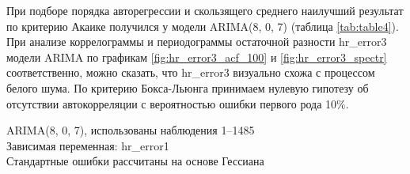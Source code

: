 \documentclass[a4paper,12pt]{article}
\begin{document}
При подборе порядка авторегрессии и скользящего среднего наилучший результат по критерию Акаике получился у модели ARIMA(8, 0, 7) (таблица \ref{tab:table4}). При анализе коррелограммы и периодограммы остаточной разности hr\_error3 модели ARIMA по графикам \ref{fig:hr_error3_acf_100} и \ref{fig:hr_error3_spectr} соответственно, можно сказать, что hr\_error3 визуально схожа с процессом белого шума. По критерию Бокса-Льюнга принимаем нулевую гипотезу об отсутствии автокорреляции с вероятностью ошибки первого рода 10\%.

\begin{table}[H]
\begin{center}
	
	ARIMA(8, 0, 7), использованы наблюдения 1--1485\\
	Зависимая переменная: hr\_error1\\
	Стандартные ошибки рассчитаны на основе Гессиана
	
	\vspace{1em}
	

\end{center}
\end{table}
\end{document}
